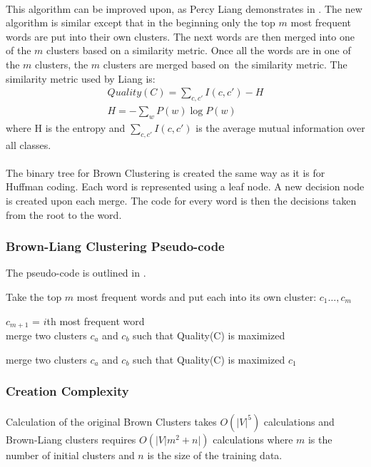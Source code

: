 \paragraph{}
This algorithm can be improved upon, as Percy Liang demonstrates in \cite{Liang2005}. The new algorithm is similar except that in the beginning only the top $m$ most frequent words are put into their own clusters. The next words are then merged into one of the $m$ clusters based on a similarity metric. Once all the words are in one of the $m$ clusters, the $m$ clusters are merged based on~the similarity metric.
The similarity metric used by Liang is:
\begin{align}
Quality(C) = \sum_{c,c'} I(c,c') - H
\\
H= -\sum_w P(w) \log P(w) \nonumber
\end{align}
where H is the entropy and $\sum_{c,c'} I(c,c')$ is the average mutual information over all classes.
\paragraph{}
The binary tree for Brown Clustering is created the same way as it is for Huffman coding. Each word is represented using a leaf node. A new decision node is created upon each merge. The code for every word is then the decisions taken from the root to the word.

\subsubsection{Brown-Liang Clustering Pseudo-code}
The pseudo-code is outlined in \cite{Collins2011}.
\begin{algorithm}
\SetAlgoLined
Take the top $m$ most frequent words and put each into its own cluster: $c_1\dots,c_m$

 {
	$c_{m+1}$ = $i$th most frequent word
	\\
	merge two clusters $c_a$ and $c_b$ such that Quality(C) is maximized
	
}
 {
merge two clusters $c_a$ and $c_b$ such that Quality(C) is maximized
}
\Return $c_1$
\end{algorithm}

\subsubsection{Creation Complexity}
\paragraph{}
Calculation of the original Brown Clusters takes $O(|V|^5)$ calculations and Brown-Liang clusters requires $O(|V| m^2+n|)$ calculations where $m$ is the number of initial clusters and $n$ is the size of the training data.  

